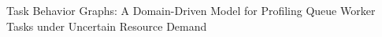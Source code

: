 Task Behavior Graphs: A Domain-Driven Model for Profiling Queue Worker Tasks under Uncertain Resource Demand
